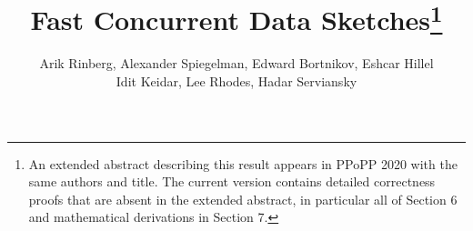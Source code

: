 \documentclass[11pt, letterpaper]{article}
\begin{document}
\title{Fast Concurrent Data Sketches\footnote{An extended abstract describing this result
appears in PPoPP 2020 with the same authors and title.
The current version contains detailed correctness proofs
that are absent in the extended abstract, in particular all of Section 6 and mathematical derivations in Section 7.}}

\author{Arik Rinberg, Alexander Spiegelman, Edward Bortnikov, Eshcar Hillel \\ Idit Keidar, Lee Rhodes, Hadar Serviansky}
   


\date{\vspace{-0.5in}}

\maketitle




















%
%








\clearpage

\appendix


\end{document}
